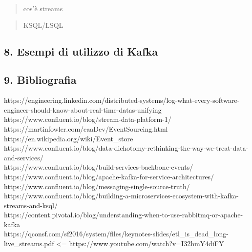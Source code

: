 \documentclass[]{article}
\begin{document}
\begin{quote}
cos'è streams
\end{quote}

\begin{quote}
KSQL/LSQL
\end{quote}

\subsection{8. Esempi di utilizzo di
Kafka}\label{esempi-di-utilizzo-di-kafka}

\newpage

\subsection{9. Bibliografia}\label{bibliografia}

https://engineering.linkedin.com/distributed-systems/log-what-every-software-engineer-should-know-about-real-time-datas-unifying
https://www.confluent.io/blog/stream-data-platform-1/
https://martinfowler.com/eaaDev/EventSourcing.html\\
https://en.wikipedia.org/wiki/Event\_store\\
https://www.confluent.io/blog/data-dichotomy-rethinking-the-way-we-treat-data-and-services/\\
https://www.confluent.io/blog/build-services-backbone-events/\\
https://www.confluent.io/blog/apache-kafka-for-service-architectures/\\
https://www.confluent.io/blog/messaging-single-source-truth/\\
https://www.confluent.io/blog/building-a-microservices-ecosystem-with-kafka-streams-and-ksql/\\
https://content.pivotal.io/blog/understanding-when-to-use-rabbitmq-or-apache-kafka\\
https://qconsf.com/sf2016/system/files/keynotes-slides/etl\_is\_dead\_long-live\_streams.pdf
\textless{}= https://www.youtube.com/watch?v=I32hmY4diFY
\end{document}
